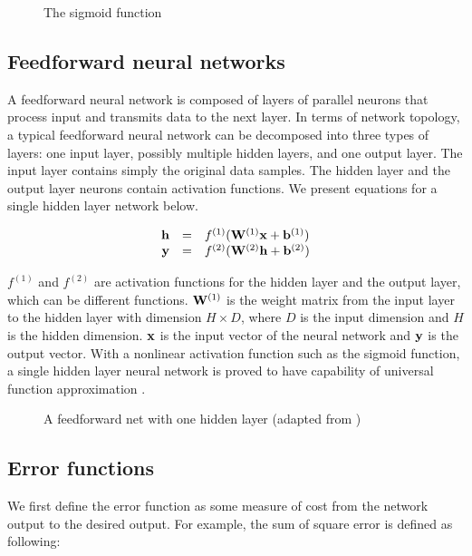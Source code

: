 \begin{figure}
\centering

\caption{The sigmoid function}
\label{fig:sigmoid}
\end{figure}

\subsection{Feedforward neural networks}
A feedforward neural network is composed of layers of parallel neurons that process input and transmits data to the next layer. In terms of network topology, a typical feedforward neural network can be decomposed into three types of layers: one input layer, possibly multiple hidden layers, and one output layer. The input layer contains simply the original data samples. The hidden layer and the output layer neurons contain activation functions. We present equations for a single hidden layer network below.

\begin{equation}
\begin{array}{r c l}
\mathbf{h} &=& f^{(1)}(\mathbf{W}^{(1)}\mathbf{x} + \mathbf{b}^{(1)})\\
\mathbf{y} &=& f^{(2)}(\mathbf{W}^{(2)}\mathbf{h} + \mathbf{b}^{(2)})
\end{array}
\end{equation}

$f^{(1)}$ and $f^{(2)}$ are activation functions for the hidden layer and the output layer, which can be different functions. $\mathbf{W}^{(1)}$ is the weight matrix from the input layer to the hidden layer with dimension $H \times D$, where $D$ is the input dimension and $H$ is the hidden dimension. $\mathbf{x}$ is the input vector of the neural network and $\mathbf{y}$ is the output vector. With a nonlinear activation function such as the sigmoid function, a single hidden layer neural network is proved to have  capability of universal function approximation \cite{du2014}. 

\begin{figure}
\centering

\caption{A feedforward net with one hidden layer (adapted from \cite{ffnn})}
\label{fig:ffnet}
\end{figure}


\subsection{Error functions}

We first define the error function as some measure of cost from the network output to the desired output. For example, the sum of square error is defined as following:

